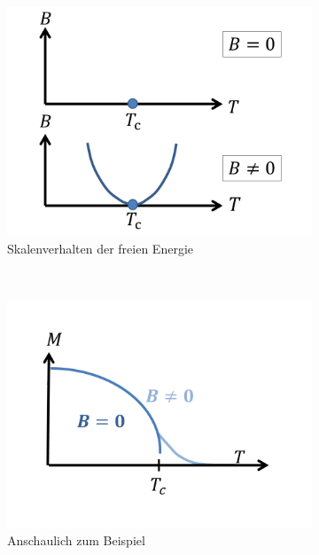 \documentclass[12pt]{article}
\begin{document}
\begin{itemize}
\begin{figure}[h] 
		\begin{subfigure}[h]{0.5 \textwidth}
		\centering
		\includegraphics[width=\textwidth]{Folie41.png}
		\caption{Skalenverhalten der freien Energie} 
		\label{crossover}
		\centering
	\end{subfigure}
	~
\begin{subfigure}[h]{0.5\textwidth}
		\centering
		\includegraphics[width=\textwidth]{Folie42.png}
		\caption{Anschaulich zum Beispiel}
		\label{fig:Anschaulich}
		\centering
	\end{subfigure}
	\caption{} %
\end{figure}	


\end{itemize}
\end{document}
